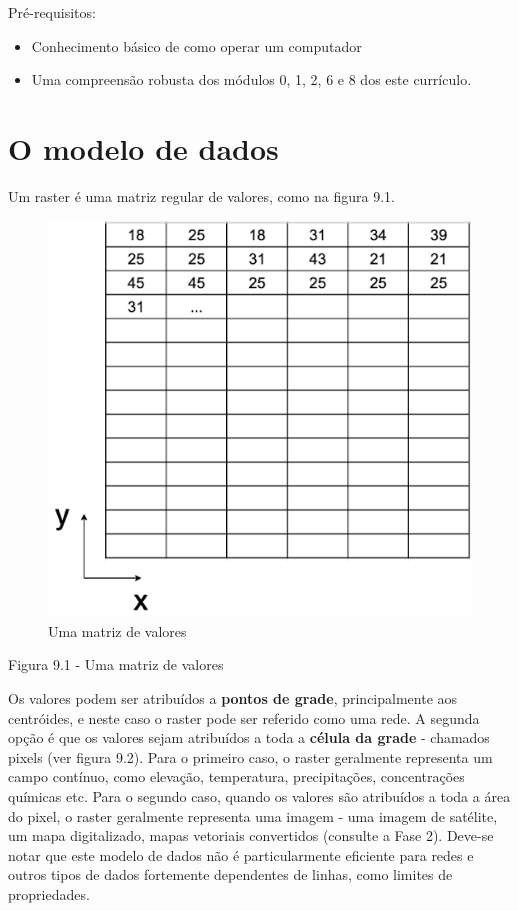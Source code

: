 \documentclass[
]{krantz}
\providecommand{\tightlist}{%
  \setlength{\itemsep}{0pt}\setlength{\parskip}{0pt}}
\begin{document}
Pré-requisitos:

\begin{itemize}
\tightlist
\item
  Conhecimento básico de como operar um computador
\item
  Uma compreensão robusta dos módulos 0, 1, 2, 6 e 8 dos este currículo.
\end{itemize}

\hypertarget{o-modelo-de-dados}{%
\section{O modelo de dados}\label{o-modelo-de-dados}}

Um raster é uma matriz regular de valores, como na figura 9.1.

\begin{figure}
\centering
\includegraphics{media/modulo9/fig91.png}
\caption{Uma matriz de valores}
\end{figure}

Figura 9.1 - Uma matriz de valores

Os valores podem ser atribuídos a \textbf{pontos de grade}, principalmente aos centróides, e neste caso o raster pode ser referido como uma rede. A segunda opção é que os valores sejam atribuídos a toda a \textbf{célula da grade} - chamados pixels (ver figura 9.2). Para o primeiro caso, o raster geralmente representa um campo contínuo, como elevação, temperatura, precipitações, concentrações químicas etc. Para o segundo caso, quando os valores são atribuídos a toda a área do pixel, o raster geralmente representa uma imagem - uma imagem de satélite, um mapa digitalizado, mapas vetoriais convertidos (consulte a Fase 2). Deve-se notar que este modelo de dados não é particularmente eficiente para redes e outros tipos de dados fortemente dependentes de linhas, como limites de propriedades.
\end{document}
